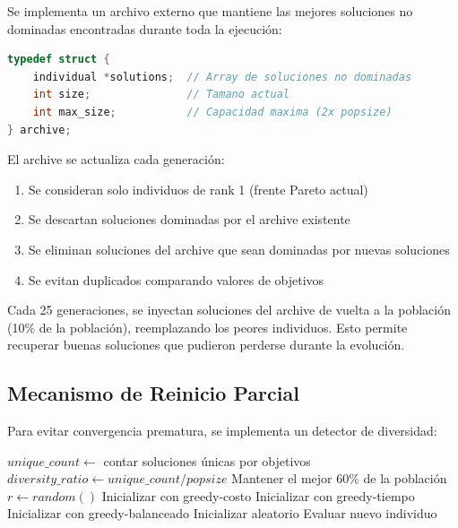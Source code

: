 \documentclass[preprint,12pt,authoryear]{elsarticle}
\begin{document}
Se implementa un archivo externo que mantiene las mejores soluciones no dominadas encontradas durante toda la ejecución:

\begin{lstlisting}[language=C, caption=Estructura del Archive]
typedef struct {
    individual *solutions;  // Array de soluciones no dominadas
    int size;               // Tamano actual
    int max_size;           // Capacidad maxima (2x popsize)
} archive;
\end{lstlisting}

El archive se actualiza cada generación:
\begin{enumerate}
    \item Se consideran solo individuos de rank 1 (frente Pareto actual)
    \item Se descartan soluciones dominadas por el archive existente
    \item Se eliminan soluciones del archive que sean dominadas por nuevas soluciones
    \item Se evitan duplicados comparando valores de objetivos
\end{enumerate}

Cada 25 generaciones, se inyectan soluciones del archive de vuelta a la población (10\% de la población), reemplazando los peores individuos. Esto permite recuperar buenas soluciones que pudieron perderse durante la evolución.

\subsection{Mecanismo de Reinicio Parcial}

Para evitar convergencia prematura, se implementa un detector de diversidad:

\begin{algorithm}[h]
\caption{Reinicio Parcial por Convergencia}
\begin{algorithmic}[1]
    \RETURN
\ENDIF
\STATE $unique\_count \leftarrow$ contar soluciones únicas por objetivos
\STATE $diversity\_ratio \leftarrow unique\_count / popsize$
    \STATE Mantener el mejor 60\% de la población
        \STATE $r \leftarrow random()$
            \STATE Inicializar con greedy-costo
            \STATE Inicializar con greedy-tiempo
            \STATE Inicializar con greedy-balanceado
        \ELSE
            \STATE Inicializar aleatorio
        \ENDIF
        \STATE Evaluar nuevo individuo
    \ENDFOR
\ENDIF
\end{algorithmic}
\end{algorithm}
\end{document}
